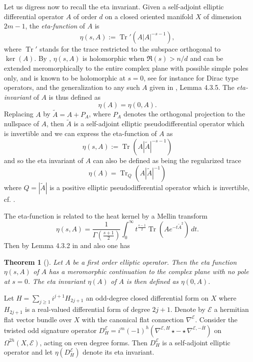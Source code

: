 \documentclass[12pt]{amsart}
\theoremstyle{plain}
\newtheorem{theorem}{Theorem}[section]
\theoremstyle{definition}
\theoremstyle{remark}
\begin{document}
{{Let us digress now to recall the eta invariant.}}
Given a self-adjoint elliptic differential operator $A$ of order $d$ on a closed 
oriented manifold $X$ of dimension $2m-1$,
the {\em eta-function} of $A$ is
$$
\eta(s,A):={\operatorname{Tr}}'(A|A|^{-s-1}), 
$$
where ${\operatorname{Tr}}'$ stands for the trace restricted to the subspace orthogonal to
$\ker(A)$. By \cite{APS1, APS2, APS3}, $\eta(s,A)$ 
is holomorphic when $\Re(s)>n/{{d}}$ and can
be extended meromorphically to the entire complex plane with possible simple
poles only,  and is
known to be holomorphic  at $s=0$, see for instance \cite{APS1, BF} for Dirac type operators, and the generalization to any such $A$ given in \cite{GilkeyBook}, Lemma 4.3.5. The {\em eta-invariant}
of $A$ is thus defined as
$$
\eta(A) = \eta(0, A).
$$
Replacing $A$ by $\widetilde A= A + P_A$, where $P_A$ denotes the orthogonal projection
to the nullspace of $A$, then $\widetilde A$ is a self-adjoint elliptic pseudodifferential 
operator which is invertible and we can express the {eta-function} of $A$ as
$$
\eta(s,A):={\operatorname{Tr}}(A|\widetilde A|^{-s-1})
$$
and so the eta invariant of $A$ can {{also}} be defined as being the regularized trace
$$
\eta(A) = {\operatorname{Tr}}_Q(A |\widetilde A|^{-1})
$$
where $Q=  |\widetilde A|$ is a positive elliptic pseudodifferential 
operator which is invertible{{, cf. \cite{CDP}}}. 

The eta-function is related
to the heat kernel by a Mellin transform
$$
\eta(s,A)=\frac{1}{\Gamma(\frac{s+1}{2})}\int_0^\infty t^{\frac{s-1}{2}}{\operatorname{Tr}}(Ae^{-t{\widetilde A}^2})\,dt.
$$
Then by Lemma 4.3.2 in \cite{GilkeyBook} and also \cite{APS3} one has

\begin{theorem}[\cite{BF, GilkeyBook}]\label{zeta-hol}
Let $A$ be a first order elliptic operator. Then the eta function $\eta(s,A)$ of $A$ has a meromorphic continuation 
to the complex plane with no pole at $s=0$. The eta invariant $\eta(A)$ of $A$ is then defined as $\eta(0,A)$.
\end{theorem}

Let 
$H = \sum_{j\geq 1} i^{j+1} H_{2j+1} $ an 
odd-degree closed differential form on $X$ where $H_{2j+1}$ is a real-valued differential form 
of degree ${2j+1}$. Denote by ${\mathcal E}$ a hermitian flat vector bundle over $X$ with the 
canonical flat connection $\nabla^{\mathcal E}$.
Consider the twisted odd signature operator 
${{D^{\mathcal E}_H = i^m (-1)^{h} (\nabla^{{\mathcal E}, H} \star -  \star \nabla^{{\mathcal E}, -\overline H})}}$ on 
$\Omega^{2h}(X, {\mathcal E})$, acting on even degree forms. Then $D^{\mathcal E}_H$ is a self-adjoint
elliptic operator 
and let $\eta(D^{\mathcal E}_H )$ denote its eta invariant. 
\end{document}
